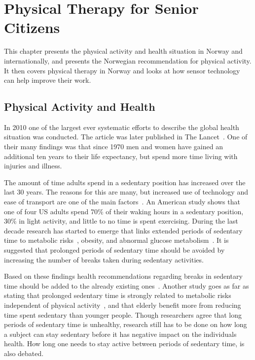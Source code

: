\chapter{Physical Therapy for Senior Citizens}
This chapter presents the physical activity and health situation in Norway and internationally, and presents the Norwegian recommendation for physical activity. It then covers physical therapy in Norway and looks at how sensor technology can help improve their work.

\section{Physical Activity and Health}
In 2010 one of the largest ever systematic efforts to describe the global health situation was conducted. The article was later published in The Lancet~\cite{globalBurden}. One of their many findings was that since 1970 men and women have gained an additional ten years to their life expectancy, but spend more time living with injuries and illness. 

The amount of time adults spend in a sedentary position has increased over the last 30 years. The reasons for this are many, but increased use of technology and ease of transport are one of the main factors~\cite{sedentaryBehaviour}. An American study shows that one of four US adults spend 70\% of their waking hours in a sedentary position, 30\% in light activity, and little to no time is spent exercising. During the last decade research has started to emerge that links extended periods of sedentary time to metabolic risks~\cite{sedentaryTime}, obesity, and abnormal glucose metabolism~\cite{breaksSedentary}. It is suggested that prolonged periods of sedentary time should be avoided by increasing the number of breaks taken during sedentary activities. 

Based on these findings health recommendations regarding breaks in sedentary time should be added to the already existing ones~\cite{breaksSedentary}. Another study goes as far as stating that prolonged sedentary time is strongly related to metabolic risks independent of physical activity~\cite{sedentaryActivity}, and that elderly benefit more from reducing time spent sedentary than younger people. Though researchers agree that long periods of sedentary time is unhealthy, research still has to be done on how long a subject can stay sedentary before it has negative impact on the individuals health. How long one needs to stay active between periods of sedentary time, is also debated.

